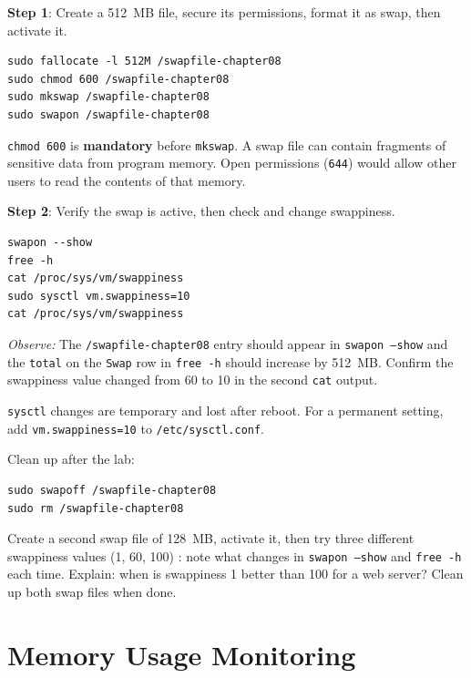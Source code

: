 \textbf{Step 1}: Create a 512~MB file, secure its permissions, format it as swap,
then activate it.

\begin{lstlisting}[caption={Creating and activating swap}]
sudo fallocate -l 512M /swapfile-chapter08
sudo chmod 600 /swapfile-chapter08
sudo mkswap /swapfile-chapter08
sudo swapon /swapfile-chapter08
\end{lstlisting}

\begin{warningbox}
\texttt{chmod 600} is \textbf{mandatory} before \texttt{mkswap}. A swap file can
contain fragments of sensitive data from program memory. Open permissions
(\texttt{644}) would allow other users to read the contents of that memory.
\end{warningbox}

\textbf{Step 2}: Verify the swap is active, then check and change swappiness.

\begin{lstlisting}[caption={Verify and set swappiness}]
swapon --show
free -h
cat /proc/sys/vm/swappiness
sudo sysctl vm.swappiness=10
cat /proc/sys/vm/swappiness
\end{lstlisting}

\textit{Observe:} The \texttt{/swapfile-chapter08} entry should appear in
\texttt{swapon --show} and the \texttt{total} on the \texttt{Swap} row in
\texttt{free -h} should increase by 512~MB. Confirm the swappiness value changed
from 60 to 10 in the second \texttt{cat} output.

\begin{notebox}
\texttt{sysctl} changes are temporary and lost after reboot. For a permanent
setting, add \texttt{vm.swappiness=10} to \texttt{/etc/sysctl.conf}.

Clean up after the lab:
\begin{lstlisting}
sudo swapoff /swapfile-chapter08
sudo rm /swapfile-chapter08
\end{lstlisting}
\end{notebox}

\begin{challengebox}
Create a second swap file of 128~MB, activate it, then try three different
swappiness values (1, 60, 100) : note what changes in \texttt{swapon --show}
and \texttt{free -h} each time. Explain: when is swappiness 1 better than 100
for a web server? Clean up both swap files when done.
\end{challengebox}

\section{Memory Usage Monitoring}

